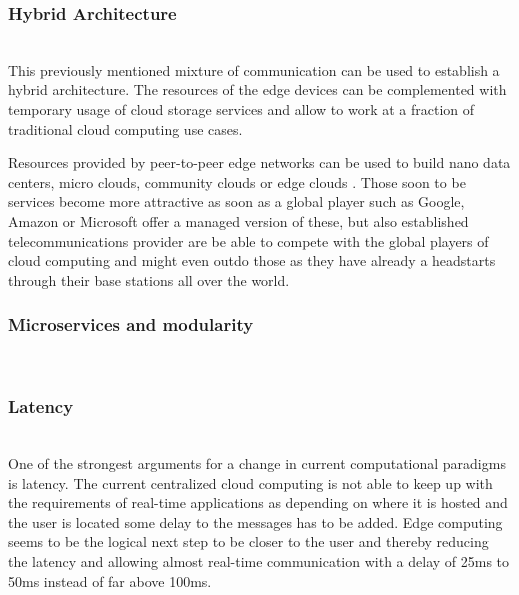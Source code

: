 \subsubsection{Hybrid Architecture}\hspace*{\fill} \\
This previously mentioned mixture of communication can be used to establish a hybrid architecture. The resources of the edge devices can be complemented with temporary usage of cloud storage services \cite{GarciaLopez:2015:ECV:2831347.2831354} and allow to work at a fraction of traditional cloud computing use cases.

Resources provided by peer-to-peer edge networks can be used to build nano data centers, micro clouds, community clouds or edge clouds \cite{GarciaLopez:2015:ECV:2831347.2831354}. Those soon to be services become more attractive as soon as a global player such as Google, Amazon or Microsoft offer a managed version of these, but also established telecommunications provider are be able to compete with the global players of cloud computing and might even outdo those as they have already a headstarts through their base stations all over the world.

\subsubsection{Microservices and modularity}\hspace*{\fill} \\

\subsubsection{Latency}\hspace*{\fill} \\
One of the strongest arguments for a change in current computational paradigms is latency. The current centralized cloud computing is not able to keep up with the requirements of real-time applications as depending on where it is hosted and the user is located some delay to the messages has to be added.
Edge computing seems to be the logical next step to be closer to the user and thereby reducing the latency and allowing almost real-time communication with a delay of 25ms to 50ms instead of far above 100ms.

